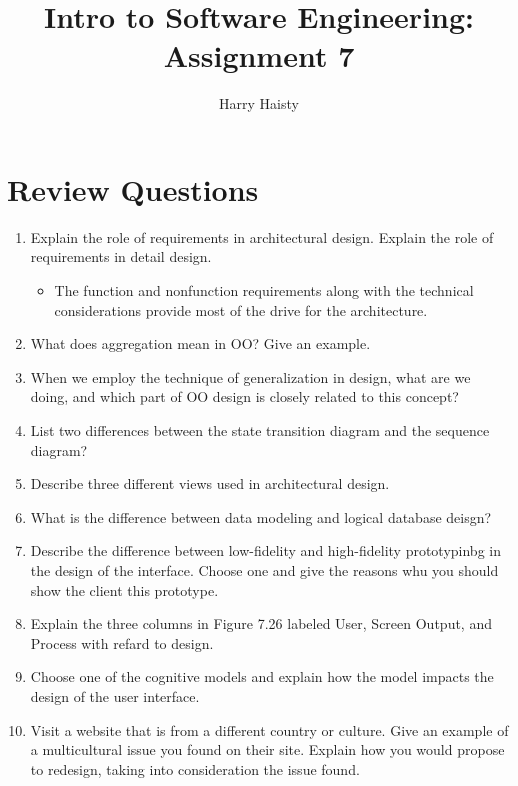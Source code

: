 \documentclass[11pt]{article}
\title{Intro to Software Engineering: Assignment 7}
\author{Harry Haisty}
\begin{document}
    \maketitle
    \section*{Review Questions}
    \begin{enumerate}
    
    \item Explain the role of requirements in architectural design. Explain the role of requirements in detail design. 
    \begin{itemize}
        \item[] The function and nonfunction requirements along with the technical considerations provide most of the drive for the architecture. 
    \end{itemize}

    \item What does aggregation mean in OO? Give an example.

    

    \item When we employ the technique of generalization in design, what are we doing, and which part of OO design is closely related to this concept?

    \item List two differences between the state transition diagram and the sequence diagram?

    \item Describe three different views used in architectural design. 

    \item What is the difference between data modeling and logical database deisgn?

    \item Describe the difference between low-fidelity and high-fidelity prototypinbg in the design of the interface. Choose one and give the reasons whu you should show the client this prototype. 

    \item Explain the three columns in Figure 7.26 labeled User, Screen Output, and Process with refard to design. 

    \item Choose one of the cognitive models and explain how the model impacts the design of the user interface. 

    \item Visit a website that is from a different country or culture. Give an example of a multicultural 
    issue you found on their site. Explain how you would propose to redesign, taking into consideration the issue found. 
    
    \end{enumerate}
    
    
\end{document}
